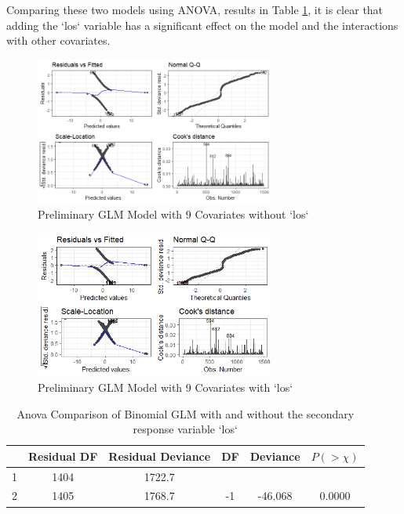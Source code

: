 \documentclass[11pt]{article}
\begin{document}
Comparing these two models using ANOVA, results in Table \ref{tab:anova-1}, it is clear that adding the `los` variable has a significant effect on the model and the interactions with other covariates.
\begin{figure}[ht]
    \centering
    \includegraphics[width=0.7\textwidth]{images/mod.nolos.png}
    \caption{Preliminary GLM Model with 9 Covariates without `los`}
    \label{img:glm-mod1-nolos}
\end{figure}

\begin{figure}[ht]
    \centering
    \includegraphics[width=0.7\textwidth]{images/mod.los.png}
    \caption{Preliminary GLM Model with 9 Covariates with `los`}
    \label{img:glm-mod1-los}
\end{figure}

\begin{table}[]
    \centering
    \begin{tabular}{|c|ccccc|}
        \hline
         & Residual DF & Residual Deviance & DF & Deviance & $P(>\chi)$ \\
        \hline
        1 & 1404 & 1722.7 &    &         &         \\
        2 & 1405 & 1768.7 & -1 & -46.068 & 0.0000  \\
        \hline
    \end{tabular}
    \caption{Anova Comparison of Binomial GLM with and without the secondary response variable `los`}
    \label{tab:anova-1}
\end{table}
\end{document}
